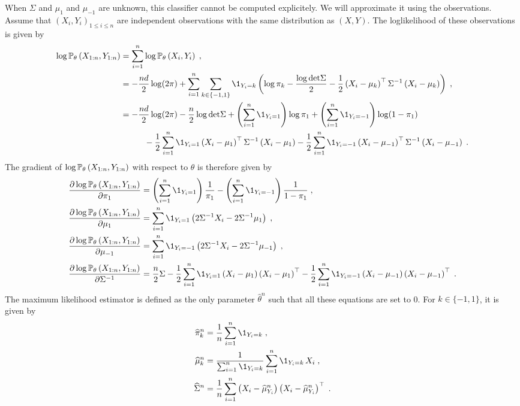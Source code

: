 When $\Sigma$ and $\mu_1$ and $\mu_{-1}$ are unknown, this classifier cannot be computed explicitely. We will approximate it using the observations. Assume that  $(X_i,Y_i)_{1\leqslant i\leqslant n}$ are independent observations with the same distribution as $(X,Y)$. The loglikelihood of these observations is given by
\begin{align*}
\log \bP_{\theta}\left(X_{1:n},Y_{1:n}\right) &=\sum_{i=1}^n \log \bP_{\theta} \left(X_{i},Y_{i}\right)\eqsp,\\
&= - \frac{nd}{2} \log(2\pi)+\sum_{i=1}^n\sum_{k\in\{-1,1\}}\1_{Y_i=k}\left(\log \pi_{k} -\frac{\log \det \Sigma}{2} - \frac{1}{2}\left(X_i - \mu_{k}\right)^\top\Sigma^{-1}\left(X_i - \mu_{k}\right)\right) \eqsp,\\
&= - \frac{nd}{2} \log(2\pi)-\frac{n}2 \log\det\Sigma + \left(\sum_{i=1}^n\1_{Y_i=1}\right)\log \pi_1 + \left(\sum_{i=1}^n\1_{Y_i=-1}\right)\log (1-\pi_{1})\\
& \hspace{1cm}-  \frac{1}{2}\sum_{i=1}^n\1_{Y_i=1}\left(X_i - \mu_{1}\right)^\top\Sigma^{-1}\left(X_i - \mu_{1}\right) -  \frac{1}{2}\sum_{i=1}^n\1_{Y_i=-1}\left(X_i - \mu_{-1}\right)^\top\Sigma^{-1}\left(X_i - \mu_{-1}\right)\eqsp.
\end{align*}
The gradient of $\log \mathbb{P}_{\theta}\left(X_{1:n},Y_{1:n}\right)$ with respect to $\theta$ is therefore given by
\begin{align*}
\frac{\partial \log \bP_{\theta}\left(X_{1:n},Y_{1:n}\right)}{\partial \pi_1} &= \left(\sum_{i=1}^n\1_{Y_i=1}\right)\frac{1}{\pi_1} - \left(\sum_{i=1}^n\1_{Y_i=-1}\right)\frac{1}{1-\pi_{1}}\eqsp,\\
\frac{\partial \log \bP_{\theta}\left(X_{1:n},Y_{1:n}\right)}{\partial \mu_1} &= \sum_{i=1}^n\1_{Y_i=1}\left(2\Sigma^{-1}X_i - 2\Sigma^{-1}\mu_{1}\right)\eqsp,\\
\frac{\partial \log \bP_{\theta}\left(X_{1:n},Y_{1:n}\right)}{\partial \mu_{-1}} &= \sum_{i=1}^n\1_{Y_i=-1}\left(2\Sigma^{-1}X_i - 2\Sigma^{-1}\mu_{-1}\right)\eqsp,\\
\frac{\partial \log \bP_{\theta}\left(X_{1:n},Y_{1:n}\right)}{\partial \Sigma^{-1}} &= \frac{n}{2}\Sigma -  \frac{1}{2}\sum_{i=1}^n\1_{Y_i=1}\left(X_i - \mu_{1}\right)\left(X_i - \mu_{1}\right)^\top -  \frac{1}{2}\sum_{i=1}^n\1_{Y_i=-1}\left(X_i - \mu_{-1}\right)\left(X_i - \mu_{-1}\right)^\top\eqsp.
\end{align*}
The maximum likelihood estimator is defined as the only parameter $\widehat \theta^n$ such that all these equations are set to 0. For $k\in\{-1,1\}$,  it is given by
\begin{align*}
\widehat \pi_k^n &= \frac{1}{n}\sum_{i=1}^n\1_{Y_i=k}\eqsp,\\
\widehat \mu_k^n &= \frac{1}{\sum_{i=1}^n\1_{Y_i=k}}\sum_{i=1}^n\1_{Y_i=k}\,X_i\eqsp,\\
\widehat\Sigma^n &= \frac{1}{n}\sum_{i=1}^n \left(X_i - \widehat \mu_{Y_i}^n\right)\left(X_i - \widehat \mu_{Y_i}^n\right)^\top\eqsp.
\end{align*}

